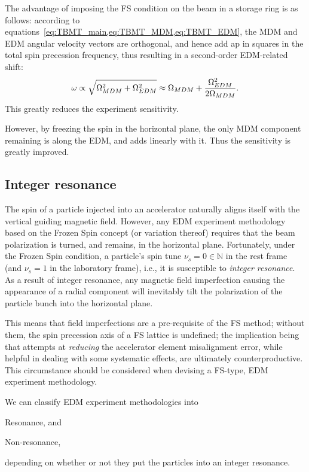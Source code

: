 \documentclass{article}
\begin{document}
The advantage of imposing the FS condition on the beam in a storage ring is as follows: according to equations~\cref{eq:TBMT_main,eq:TBMT_MDM,eq:TBMT_EDM}, the MDM and EDM angular velocity vectors are orthogonal, and hence add ap in squares in the total spin precession frequency, thus resulting in a second-order EDM-related shift:~\cite[p. 5]{Mane:SpinWheel}
\[
\omega \propto \sqrt{\Omega_{MDM}^2 + \Omega_{EDM}^2} \approx \Omega_{MDM} + \frac{\Omega_{EDM}^2}{2\Omega_{MDM}}.
\]
This greatly reduces the experiment sensitivity.

However, by freezing the spin in the horizontal plane, the only MDM component remaining is along the EDM, and adds linearly with it. Thus the sensitivity is greatly improved.

\subsection{Integer resonance}
The spin of a particle injected into an accelerator naturally aligns itself with the vertical guiding magnetic field. However, any EDM experiment methodology based on the Frozen Spin concept (or variation thereof) requires that the beam polarization is turned, and remains, in the horizontal plane. Fortunately, under the Frozen Spin condition, a particle's spin tune $\nu_s = 0 \in \mathbb{N}$ in the rest frame (and $\nu_s = 1$ in the laboratory frame), i.e., it is susceptible to \emph{integer resonance}.~\cite{COSY:ImperfectionResonance} As a result of integer resonance, any magnetic field imperfection causing the appearance of a radial component will inevitably tilt the polarization of the particle bunch into the horizontal plane.~\cite[p. 8]{COSY:ImperfectionResonance}

This means that field imperfections are a pre-requisite of the FS method; without them, the spin precession axis of a FS lattice is undefined; the implication being that attempts at \emph{reducing} the accelerator element misalignment error, while helpful in dealing with some systematic effects, are ultimately counterproductive. This circumstance should be considered when devising a FS-type, EDM experiment methodology.

We can classify EDM experiment methodologies into
\begin{inparaenum}[1)]
\item Resonance, and
\item Non-resonance,
\end{inparaenum}
depending on whether or not they put the particles into an integer resonance.
\end{document}

